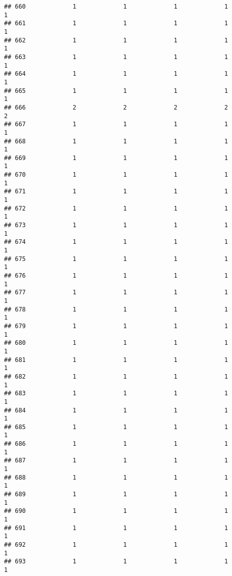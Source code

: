 \documentclass[
]{article}
\begin{document}
\begin{verbatim}
## 660             1             1             1             1             1
## 661             1             1             1             1             1
## 662             1             1             1             1             1
## 663             1             1             1             1             1
## 664             1             1             1             1             1
## 665             1             1             1             1             1
## 666             2             2             2             2             2
## 667             1             1             1             1             1
## 668             1             1             1             1             1
## 669             1             1             1             1             1
## 670             1             1             1             1             1
## 671             1             1             1             1             1
## 672             1             1             1             1             1
## 673             1             1             1             1             1
## 674             1             1             1             1             1
## 675             1             1             1             1             1
## 676             1             1             1             1             1
## 677             1             1             1             1             1
## 678             1             1             1             1             1
## 679             1             1             1             1             1
## 680             1             1             1             1             1
## 681             1             1             1             1             1
## 682             1             1             1             1             1
## 683             1             1             1             1             1
## 684             1             1             1             1             1
## 685             1             1             1             1             1
## 686             1             1             1             1             1
## 687             1             1             1             1             1
## 688             1             1             1             1             1
## 689             1             1             1             1             1
## 690             1             1             1             1             1
## 691             1             1             1             1             1
## 692             1             1             1             1             1
## 693             1             1             1             1             1

\end{verbatim}
\end{document}
